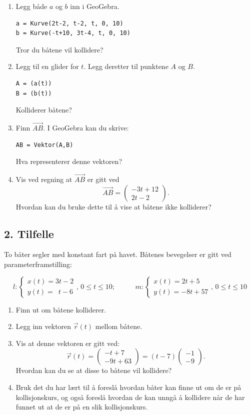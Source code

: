 \documentclass[a4paper,12pt]{article}
\begin{document}
\begin{enumerate}[label=\alph*)]
\item Legg både $a$ og $b$ inn i GeoGebra. 
\begin{lstlisting}
a = Kurve(2t-2, t-2, t, 0, 10)
b = Kurve(-t+10, 3t-4, t, 0, 10)
\end{lstlisting}
Tror du båtene vil kollidere?
\item Legg til en glider for $t$. Legg deretter til punktene $A$ og $B$.
\begin{lstlisting}
A = (a(t))
B = (b(t))
\end{lstlisting}
Kolliderer båtene?
\item Finn $\overrightarrow{AB}$. I GeoGebra kan du skrive:
\begin{lstlisting}
AB = Vektor(A,B)
\end{lstlisting}
Hva representerer denne vektoren?

\item Vis ved regning at $\overrightarrow{AB}$ er gitt ved
\[
\overrightarrow{AB} =
\begin{pmatrix}
-3t + 12 \\
2t -2
\end{pmatrix}.
\]
Hvordan kan du bruke dette til å vise at båtene ikke kolliderer?
\end{enumerate}


\subsection*{2. Tilfelle}
To båter segler med konstant fart på havet. Båtenes bevegelser er gitt ved parameterframstilling:

\[
l:
\begin{cases}
x(t)=3t - 2 \\
y(t)=\phantom{3}t-6
\end{cases},\, 0 \leq t \leq 10; \,\,\,\,\,\,\,\,\,\,\,\,\,\,\,\,\, m:
\begin{cases}
x(t)=2t + 5 \\
y(t)=-8t+57
\end{cases},\, 0 \leq t \leq 10
\]

\begin{enumerate}[label=\alph*)]
\item Finn ut om båtene kolliderer.
\item Legg inn vektoren $\vec r(t)$ mellom båtene.
\item Vis at denne vektoren er gitt ved:
\[
\vec r(t) =
\begin{pmatrix}
-t+7 \\
-9t +63
\end{pmatrix} = (t-7)
\begin{pmatrix}
-1\\
-9
\end{pmatrix}.
\]
Hvordan kan du se at disse to båtene vil kollidere?

\item Bruk det du har lært til å foreslå hvordan båter kan finne ut om de er på kollisjonskurs, og også foreslå hvordan de kan unngå å kollidere når de har funnet ut at de er på en slik kollisjonskurs.

\end{enumerate}
\end{document}
